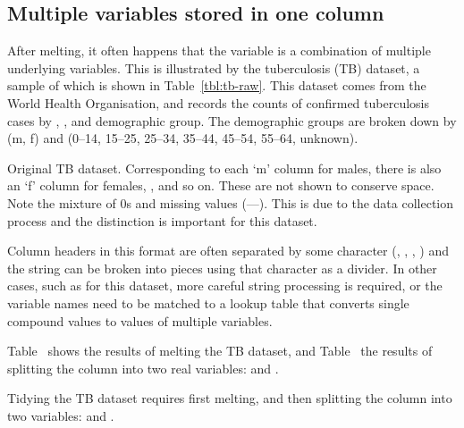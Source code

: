 \documentclass[article]{jss}
\begin{document}
\subsection{Multiple variables stored in one column}

After melting, it often happens that the  variable is a combination of multiple underlying variables. This is illustrated by the tuberculosis (TB) dataset, a sample of which is shown in Table~\ref{tbl:tb-raw}. This dataset comes from the World Health Organisation, and records the counts of confirmed tuberculosis cases by , , and demographic group. The demographic groups are broken down by  (m, f) and  (0--14, 15--25, 25--34, 35--44, 45--54, 55--64, unknown). 

\begin{table}[htbp]
  \centering
  
  \caption{Original TB dataset. Corresponding to each `m' column for males, there is also an `f' column for females, ,  and so on. These are not shown to conserve space. Note the mixture of 0s and missing values (---). This is due to the data collection process and the distinction is important for this dataset.}
  \label{tbl:tb-raw}
\end{table}

Column headers in this format are often separated by some character (, \code{-}, \code{\_}, \code{:}) and the string can be broken into pieces using that character as a divider. In other cases, such as for this dataset, more careful string processing is required, or the variable names need to be matched to a lookup table that converts single compound values to values of multiple variables. 

Table~ shows the results of melting the TB dataset, and Table~ the results of splitting the column  into two real variables:  and .  

\begin{table}[htbp]
  \centering
  \hspace{2em}%
  
  \caption{Tidying the TB dataset requires first melting, and then splitting the  column into two variables:  and .}
  \label{tbl:tb-clean}
\end{table}
\end{document}
